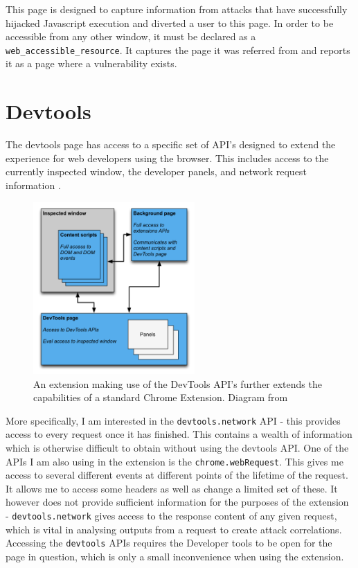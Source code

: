 This page is designed to capture information from attacks that have successfully hijacked Javascript execution and diverted a user to this page. In order to be accessible from any other window, it must be declared as a \texttt{web\_accessible\_resource}. It captures the page it was referred from and reports it as a page where a vulnerability exists.

\section{Devtools} \label{devtools}

The devtools page has access to a specific set of API's designed to extend the experience for web developers using the browser. This includes access to the currently inspected window, the developer panels, and network request information \cite{chromeExtensionDevTools}. \\

\begin{figure}[h]
	\centering
	\includegraphics[width=0.55\textwidth]{images/devtools-extension.png}
	\caption{An extension making use of the DevTools API's further extends the capabilities of a standard Chrome Extension. Diagram from \cite{chromeExtensionDevTools}}
	\label{fig:test}
\end{figure}

More specifically, I am interested in the \texttt{devtools.network} API - this provides access to every request once it has finished. This contains a wealth of information which is otherwise difficult to obtain without using the devtools API. One of the APIs I am also using in the extension is the \texttt{chrome.webRequest}. This gives me access to several different events at different points of the lifetime of the request. It allows me to access some headers as well as change a limited set of these. It however does not provide sufficient information for the purposes of the extension - \texttt{devtools.network} gives access to the response content of any given request, which is vital in analysing outputs from a request to create attack correlations. Accessing the \texttt{devtools} APIs requires the Developer tools to be open for the page in question, which is only a small inconvenience when using the extension.

